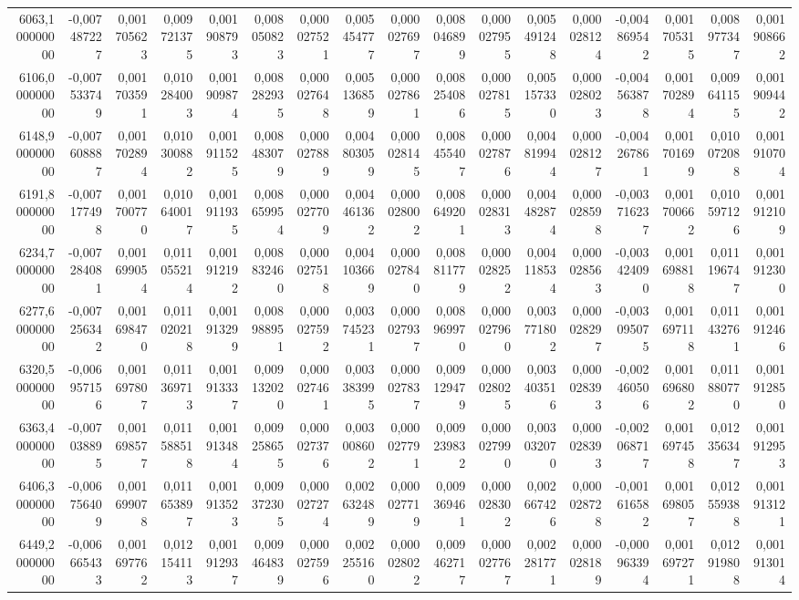 \begin{longtable}{rrrrrrrrrrrrrrrrr}
6063,100000000 & -0,007487227 & 0,001705623 & 0,009721375 & 0,001908793 & 0,008050823 & 0,000027521 & 0,005454777 & 0,000027697 & 0,008046899 & 0,000027955 & 0,005491248 & 0,000028124 & -0,004869542 & 0,001705315 & 0,008977347 & 0,001908662\\
6106,000000000 & -0,007533749 & 0,001703591 & 0,010284003 & 0,001909874 & 0,008282935 & 0,000027648 & 0,005136859 & 0,000027861 & 0,008254086 & 0,000027815 & 0,005157330 & 0,000028023 & -0,004563878 & 0,001702894 & 0,009641155 & 0,001909442\\
6148,900000000 & -0,007608887 & 0,001702894 & 0,010300882 & 0,001911525 & 0,008483079 & 0,000027889 & 0,004803059 & 0,000028145 & 0,008455407 & 0,000027876 & 0,004819944 & 0,000028127 & -0,004267861 & 0,001701699 & 0,010072088 & 0,001910704\\
6191,800000000 & -0,007177498 & 0,001700770 & 0,010640017 & 0,001911935 & 0,008659954 & 0,000027709 & 0,004461362 & 0,000028002 & 0,008649201 & 0,000028313 & 0,004482874 & 0,000028598 & -0,003716237 & 0,001700662 & 0,010597126 & 0,001912109\\
6234,700000000 & -0,007284081 & 0,001699054 & 0,011055214 & 0,001912192 & 0,008832460 & 0,000027518 & 0,004103669 & 0,000027840 & 0,008811779 & 0,000028252 & 0,004118534 & 0,000028563 & -0,003424090 & 0,001698818 & 0,011196747 & 0,001912300\\
6277,600000000 & -0,007256342 & 0,001698470 & 0,011020218 & 0,001913299 & 0,008988951 & 0,000027592 & 0,003745231 & 0,000027937 & 0,008969970 & 0,000027960 & 0,003771802 & 0,000028297 & -0,003095075 & 0,001697118 & 0,011432761 & 0,001912466\\
6320,500000000 & -0,006957156 & 0,001697807 & 0,011369713 & 0,001913337 & 0,009132020 & 0,000027461 & 0,003383995 & 0,000027837 & 0,009129479 & 0,000028025 & 0,003403516 & 0,000028393 & -0,002460506 & 0,001696802 & 0,011880770 & 0,001912850\\
6363,400000000 & -0,007038895 & 0,001698577 & 0,011588518 & 0,001913484 & 0,009258655 & 0,000027376 & 0,003008602 & 0,000027791 & 0,009239832 & 0,000027990 & 0,003032070 & 0,000028393 & -0,002068717 & 0,001697458 & 0,012356347 & 0,001912953\\
6406,300000000 & -0,006756409 & 0,001699078 & 0,011653897 & 0,001913523 & 0,009372305 & 0,000027274 & 0,002632489 & 0,000027719 & 0,009369461 & 0,000028302 & 0,002667426 & 0,000028728 & -0,001616582 & 0,001698057 & 0,012559388 & 0,001913121\\
6449,200000000 & -0,006665433 & 0,001697762 & 0,012154113 & 0,001912937 & 0,009464839 & 0,000027596 & 0,002255160 & 0,000028022 & 0,009462717 & 0,000027767 & 0,002281771 & 0,000028189 & -0,000963394 & 0,001697271 & 0,012919808 & 0,001913014\\

\end{longtable}
